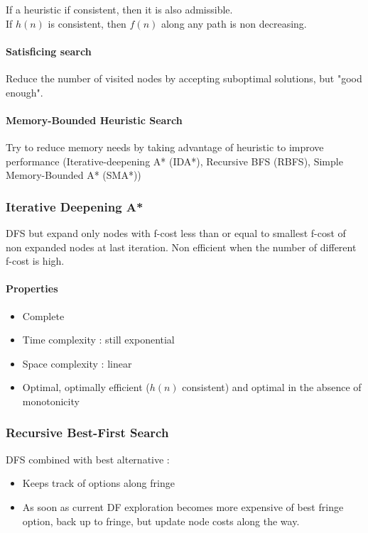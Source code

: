 If a heuristic if consistent, then it is also admissible.\\
If $h(n)$ is consistent, then $f(n)$ along any path is non decreasing.

\paragraph{Satisficing search}
Reduce the number of visited nodes by accepting suboptimal solutions, but "good enough".

\paragraph{Memory-Bounded Heuristic Search}
Try to reduce memory needs by taking advantage of heuristic to improve performance (Iterative-deepening A* (IDA*), Recursive BFS (RBFS), Simple Memory-Bounded A* (SMA*))

\subsubsection{Iterative Deepening A*}

DFS but expand only nodes with f-cost less than or equal to smallest f-cost of non expanded nodes at last iteration. Non efficient when the number of different f-cost is high.

\paragraph{Properties}
\begin{itemize}
\item Complete
\item Time complexity : still exponential
\item Space complexity : linear
\item Optimal, optimally efficient ($h(n)$ consistent) and optimal in the absence of monotonicity
\end{itemize}

\subsubsection{Recursive Best-First Search}

DFS combined with best alternative :
\begin{itemize}
\item Keeps track of options along fringe
\item As soon as current DF exploration becomes more expensive of best fringe option, back up to fringe, but update node costs along the way.
\end{itemize}

